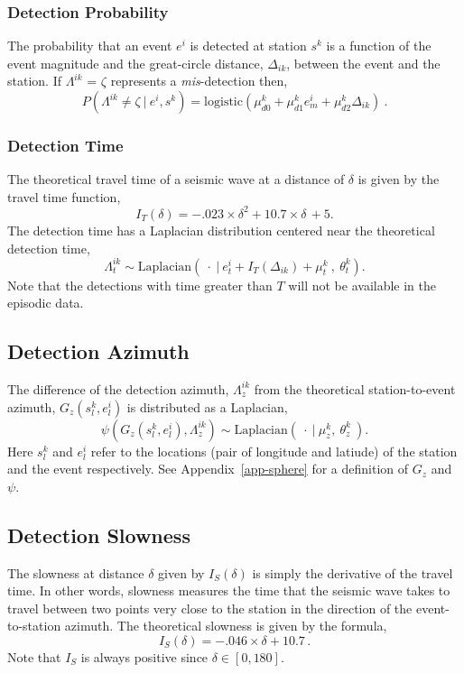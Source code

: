 \documentclass[12pt,letterpaper,onecolumn,oneside]{article}
\begin{document}
\subsubsection{Detection Probability}

The probability that an event $e^i$ is detected at station $s^k$ is a
function of the event magnitude and the great-circle distance,
$\Delta_{ik}$, between the event and the station. If $\Lambda^{ik}$ =
$\zeta$ represents a {\em mis}-detection then,
\[P(\Lambda^{ik} \ne \zeta \ | \ e^i , s^k) = \text{logistic}
(\mu_{d0}^k + \mu_{d1}^k e^i_m + \mu_{d2}^k \Delta_{ik}) \ .\]

\subsubsection{Detection Time}

The theoretical travel time of a seismic wave at a distance of $\delta$ is
given by the travel time function,
\[ I_T(\delta) = -.023 \times \delta^2 + 10.7 \times \delta\, + 5.\]
The detection time has a Laplacian distribution
 centered near the theoretical detection time,
\[ \Lambda_t^{ik} \sim \text{Laplacian}(\ \cdot \ | \ e^i_t + I_T(\Delta_{ik}) +
\mu_t^k \  , \ \theta_t^k) . \]
Note that the detections with time greater than $T$ will not be
available in the episodic data.

\subsection{Detection Azimuth}

The difference of the detection azimuth, $\Lambda_z^{ik}$ from the theoretical
station-to-event azimuth, $G_z(s^k_l, e^i_l)$  is distributed as a Laplacian,
\[\psi(G_z(s^k_l, e^i_l), \Lambda_z^{ik}) \sim \text{Laplacian}(\ \cdot
\ | \  \mu_z^k, \ \theta_z^k \ ) . \]
Here $s^k_l$ and $e^i_l$ refer to the locations (pair of longitude and
latiude) of the station and the event respectively. See
Appendix~\ref{app-sphere} for a definition of $G_z$ and $\psi$.

\subsection{Detection Slowness}
The slowness at distance $\delta$ given by $I_S(\delta)$ is simply the
derivative of the travel time. In other words, slowness measures
the time that the seismic wave takes to travel between two points very
close to the station in the direction of the event-to-station
azimuth. The theoretical slowness is given by the formula,
\[ I_S(\delta) = -.046 \times \delta + 10.7\, .\]
Note that $I_S$ is always positive since $\delta \in [0, 180]$.
\end{document}
